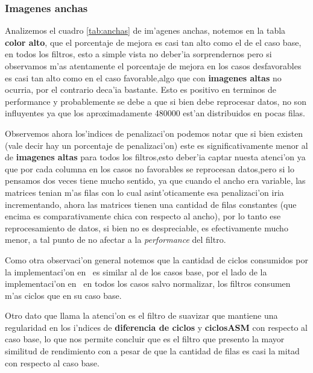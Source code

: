 \subsubsection{Imagenes anchas}
Analizemos el cuadro \ref{tab:anchas} de im'agenes anchas, notemos en la tabla \textbf{color alto}, que el porcentaje de mejora es
casi tan alto como el de el caso base, en todos los filtros, esto a simple vista no deber'ia
 sorprendernos pero si observamos m'as atentamente el porcentaje de mejora en los casos desfavorables es 
casi tan alto como en el caso favorable,algo que con \textbf{imagenes altas} no ocurria, por el contrario
deca'ia bastante. Esto es positivo en terminos de performance y probablemente se debe a que si bien
debe reprocesar datos, no son influyentes ya que los aproximadamente 480000 est'an distribuidos en
pocas filas.

Observemos ahora los'indices de penalizaci'on podemos notar que si bien existen (vale decir hay un porcentaje
 de penalizaci'on) este es significativamente menor al de \textbf{imagenes altas} para todos los filtros,esto
deber'ia captar nuesta atenci'on ya que por cada columna en los casos no favorables se reprocesan datos,pero
si lo pensamos dos veces tiene mucho sentido, ya que cuando el ancho era variable, las matrices
tenian m'as filas con lo cual asint'oticamente esa penalizaci'on iria incrementando, ahora las matrices
tienen una cantidad de filas constantes (que encima es comparativamente chica con respecto al ancho),
por lo tanto ese reprocesamiento de datos, si bien no es despreciable, es efectivamente mucho menor,
a tal punto de no afectar a la \textit{performance} del filtro.

Como otra observaci'on general notemos que la cantidad de ciclos consumidos por la implementaci'on en \C \ es
similar al de los casos base, por el lado de la implementaci'on en \ass \ en todos los casos salvo normalizar,
los filtros consumen m'as ciclos que en su caso base.

Otro dato que llama la atenci'on es el filtro de suavizar que mantiene una regularidad en los i'ndices de 
\textbf{diferencia de ciclos} y \textbf{ciclosASM} con respecto al caso base, lo que nos permite concluir que es el filtro que
presento la mayor similitud de rendimiento con a pesar de que la cantidad de filas es casi la mitad con respecto al caso
base.



